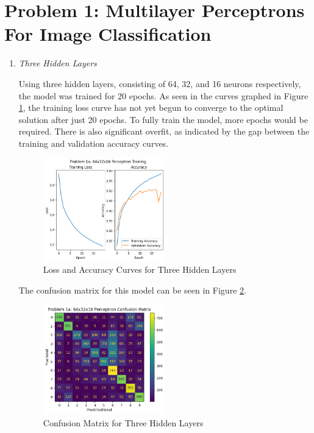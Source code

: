 \documentclass{article}
\begin{document}


\section{Problem 1: Multilayer Perceptrons For Image Classification}

\begin{enumerate}[label=1\alph*. ]
    \item \textit{Three Hidden Layers}
    
    Using three hidden layers, consisting of 64, 32, and 16
    neurons respectively, the model was trained for 20
    epochs. As seen in the curves graphed in Figure
    \ref{fig:loss_1a}, the training loss curve has not yet
    begun to converge to the optimal solution after just 20
    epochs. To fully train the model, more epochs would be
    required. There is also significant overfit, as
    indicated by the gap between the training and validation
    accuracy curves.
    
    \begin{figure}[h]
        \centering
        \includegraphics[width=0.5\textwidth]{images/loss_1a.png}
        \caption{Loss and Accuracy Curves for Three Hidden Layers}
        \label{fig:loss_1a}
    \end{figure} 
    The confusion matrix for this model can be seen in
    Figure \ref{fig:confusion_1a}.
    \begin{figure}[h]
        \centering
        \includegraphics[width=0.5\textwidth]{images/conf_1a.png}
        \caption{Confusion Matrix for Three Hidden Layers}
        \label{fig:confusion_1a}
    \end{figure} 


\end{enumerate}
\end{document}
